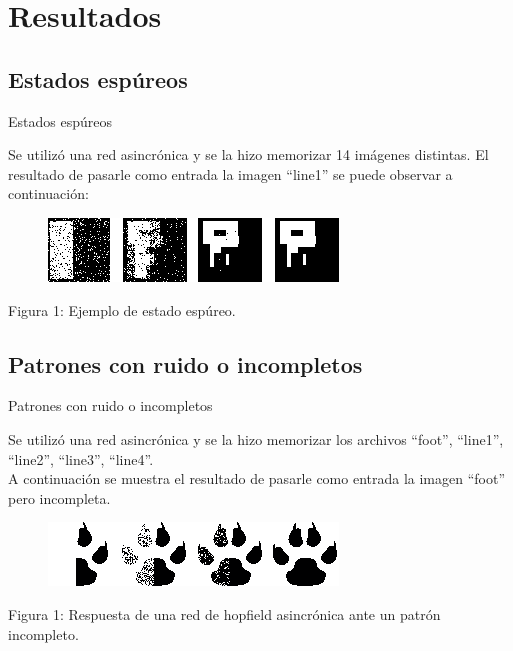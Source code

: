 \documentclass{beamer}
\begin{document}
\section{Resultados}

\subsection{Estados espúreos}
\begin{frame}{Estados espúreos}

\par Se utilizó una red asincrónica y se la hizo memorizar 14 imágenes distintas. 
El resultado de pasarle como entrada la imagen ``line1'' se puede observar a continuación:\\

\begin{figure}[H]
\begin{center}
\includegraphics[scale=0.60]{./images/espureo.png}
\label{modelado}
\end{center}
\end{figure}

\begin{center}
\par Figura 1: Ejemplo de estado espúreo.
\end{center}

\end{frame}

\subsection{Patrones con ruido o incompletos}
\begin{frame}{Patrones con ruido o incompletos}


\par Se utilizó una red asincrónica y se la hizo memorizar los archivos ``foot'', ``line1'', ``line2'', ``line3'', ``line4''.\\

A continuación se muestra el resultado de pasarle como entrada la imagen ``foot'' pero incompleta.\\

\begin{figure}[H]
\begin{center}
\includegraphics[scale=0.60]{./images/half.png}
\label{modelado}
\end{center}
\end{figure}

\begin{center}
\par Figura 1: Respuesta de una red de hopfield asincrónica ante un patrón incompleto.
\end{center}

\end{frame}
\end{document}
